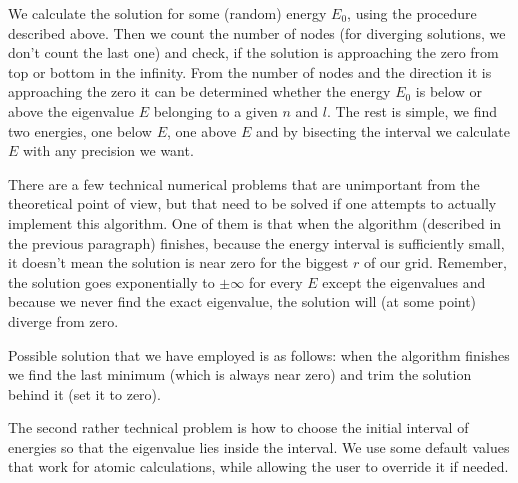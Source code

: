 We calculate the solution for some (random) energy $E_0$, using the
procedure described above. Then we count the number of nodes 
(for diverging solutions, we don't count the last one) and check, if the
solution is approaching the zero from top or bottom in the infinity. From the
number of nodes and the direction it is approaching the zero it can be
determined
whether the energy $E_0$ is below or above the eigenvalue $E$ belonging to a given
$n$ and $l$. The rest is simple, we find two energies, one below $E$, one above
$E$ and by bisecting the interval we calculate $E$ with any precision we want.

There are a few technical numerical problems that are unimportant from the
theoretical point of view, but that need to be solved if one attempts to
actually implement this algorithm. One of them is that when the algorithm
(described in the previous paragraph) finishes, because the energy interval is
sufficiently small, it doesn't mean
the solution is near zero for the biggest $r$ of our grid.
Remember, the solution goes exponentially to $\pm\infty$ for every $E$ except
the eigenvalues and because we never find the exact eigenvalue, the solution
will (at some point) diverge from zero. 

Possible solution that we have employed is as follows: 
when the algorithm finishes we find the last minimum (which is always near
zero) and trim the solution behind it (set it to zero). 

The second rather technical problem is how to choose the initial interval of
energies so that the eigenvalue lies inside the interval. We use some default
values that work for atomic calculations, while allowing the user to override
it if needed. 

